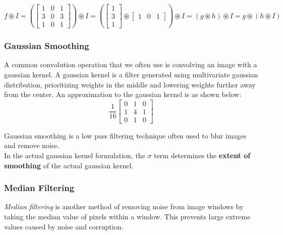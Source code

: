 \documentclass[12pt]{article}
\begin{document}
\begin{equation*}
f \circledast I = (
\begin{bmatrix}
1 & 0 & 1\\
3& 0 & 3\\
1 & 0 & 1
\end{bmatrix}) \circledast I = (
\begin{bmatrix}
1\\
3\\
1
\end{bmatrix} \circledast 
\begin{bmatrix}
1 & 0 & 1
\end{bmatrix}) \circledast I = (g \circledast h) \circledast I = g \circledast (h \circledast I)
\end{equation*}

\subsubsection{Gaussian Smoothing}

A common convolution operation that we often use is convolving an image with a gaussian kernel. A gaussian kernel is a filter generated using multivariate gaussian distribution, prioritizing weights in the middle and lowering weights further away from the center. An approximation to the gaussian kernel is as shown below:
\begin{equation}
\frac{1}{16}
\begin{bmatrix}
0 & 1 & 0\\
1& 4 & 1\\
0 & 1 & 0
\end{bmatrix}
\end{equation}

Gaussian smoothing is a low pass filtering technique often used to blur images and remove noise.\\ 
In the actual gaussian kernel formulation, the $\sigma$ term determines the \textbf{extent of smoothing} of the actual gaussian kernel. \\

\subsubsection{Median Filtering}

\textit{Median filtering} is another method of removing noise from image windows by taking the median value of pixels within a window. This prevents large extreme values caused by noise and corruption.\\
\end{document}

